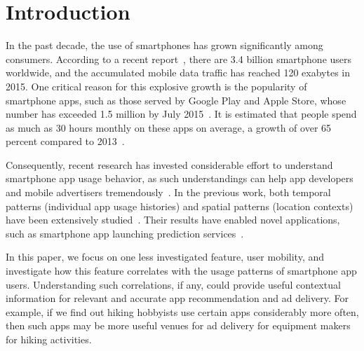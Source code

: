 \section{Introduction}\label{intro}

In the past decade, the use of smartphones has grown significantly among consumers.
According to a recent report~\cite{Ericsson}, there are 3.4 billion smartphone users worldwide,
and the accumulated mobile data traffic has reached 120 exabytes in 2015.
One critical reason for this explosive growth is the popularity of smartphone apps,
such as those served by Google Play and Apple Store,
whose number has exceeded 1.5 million by July 2015~\cite{Statista}.
It is estimated that people spend as much as 30 hours monthly on these apps on average,
a growth of over 65 percent compared to 2013~\cite{Nielsen}.

Consequently, recent research has invested considerable effort to understand smartphone app usage behavior,
as such understandings can help app developers and mobile advertisers tremendously~\cite{xu2011identifying,yang2015characterizing}.
In the previous work, both temporal patterns (\eg individual app usage histories) and
spatial patterns (\eg location contexts) have been extensively studied~\cite{meng2014analyzing}.
Their results have enabled novel applications,
such as smartphone app launching prediction services~\cite{yan2012fast}.

In this paper, we focus on one less investigated feature, user mobility,
and investigate how this feature correlates with the usage patterns of smartphone app users.
Understanding such correlations, if any, could provide useful contextual information
for relevant and accurate app recommendation and ad delivery.
For example, if we find out hiking hobbyists use certain apps considerably more often,
then such apps may be more useful venues for ad delivery for equipment makers for hiking activities.

